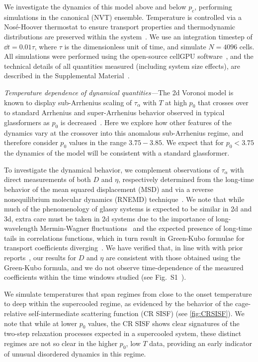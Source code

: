 \documentclass[amsmath,amssymb,prl,reprint,twocolumn]{revtex4-2}
\begin{document}
We investigate the dynamics of this model above and below $p_c$, performing simulations in the canonical (NVT) ensemble.
Temperature is controlled via a Nos\'e-Hoover thermostat to ensure transport properties and thermodynamic distributions are preserved within the system~\cite{Basconi2013}.
We use an integration timestep of $\dd t = 0.01\tau$, where $\tau$ is the dimensionless unit of time, and simulate $N=4096$ cells.
All simulations were performed using the open-source cellGPU software~\cite{Sussman2017}, and the technical details of all quantities measured (including system size effects), are described in the Supplemental Material~\cite{Supp}.



\emph{Temperature dependence of dynamical quantities---}The 2d Voronoi model is known to display sub-Arrhenius scaling of $\tau_{\alpha}$ with $T$ at high $p_0$ that crosses over to standard Arrhenius and super-Arrhenius behavior observed in typical glassformers as $p_0$ is decreased~\cite{Sussman2018EPL,Li2021}.
Here we explore how other features of the dynamics vary at the crossover into this anomalous sub-Arrhenius regime, and therefore consider $p_0$ values in the range $3.75-3.85$. 
We expect that for $p_0<3.75$ the dynamics of the model will be consistent with a standard glassformer.


To investigate the dynamical behavior, we complement observations of $\tau_{\alpha}$ with direct measurements of both $D$ and $\eta$, respectively determined from the long-time behavior of the mean squared displacement (MSD) and via a reverse nonequilibrium molecular dynamics (RNEMD) technique~\cite{MullerPlathe1999,Kuang2012}.
We note that while much of the phenomenology of glassy systems is expected to be similar in 2d and 3d, extra care must be taken in 2d systems due to the importance of long-wavelength Mermin-Wagner fluctuations~\cite{Flenner2015,Illing2017} and the expected presence of long-time tails in correlations functions, which in turn result in Green-Kubo formulae for transport coefficients diverging~\cite{Alder1970,Ernst1970,Dorfman1970,Forster1977}.
We have verified that, in line with with prior reports~\cite{Gravina1995,Liu2006}, our results for $D$ and $\eta$ are consistent with those obtained using the Green-Kubo formula, and we do not observe time-dependence of the measured coefficients within the time windows studied (see Fig.~S1~\cite{Supp}).


We simulate temperatures that span regimes from close to the onset temperature to deep within the supercooled regime, as evidenced by the behavior of the cage-relative self-intermediate scattering function (CR SISF) (see \cref{fig:CRSISF}). 
We note that while at lower $p_0$ values, the CR SISF shows clear signatures of the two-step relaxation processes expected in a supercooled system, these distinct regimes are not so clear in the higher $p_0$, low $T$ data, providing an early indicator of unusual disordered dynamics in this regime.
\end{document}
